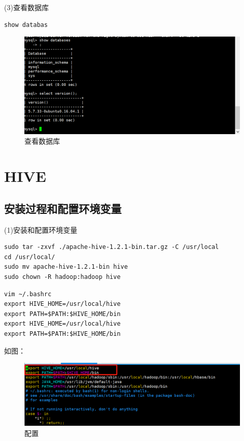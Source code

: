 \documentclass[12pt]{article}
\begin{document}
(3)查看数据库
\begin{lstlisting}[language={[ANSI]C}]
show databas
\end{lstlisting}


\begin{figure}[ht]
\centering
\includegraphics[scale=0.8]{figures/4.png}
\caption{查看数据库}\label{fig:label2}
\end{figure}


\section{HIVE}

\subsection{安装过程和配置环境变量}

(1)安装和配置环境变量
\begin{lstlisting}[language={[ANSI]C}]
sudo tar -zxvf ./apache-hive-1.2.1-bin.tar.gz -C /usr/local
cd /usr/local/
sudo mv apache-hive-1.2.1-bin hive
sudo chown -R hadoop:hadoop hive
\end{lstlisting}

\begin{lstlisting}[language={[ANSI]C}]
vim ~/.bashrc
export HIVE_HOME=/usr/local/hive
export PATH=$PATH:$HIVE_HOME/bin
export HIVE_HOME=/usr/local/hive
export PATH=$PATH:$HIVE_HOME/bin
\end{lstlisting}

如图：

\begin{figure}[ht]
\centering
\includegraphics[scale=0.8]{figures/7.png}
\caption{配置}\label{fig:label2}
\end{figure}
\end{document}
